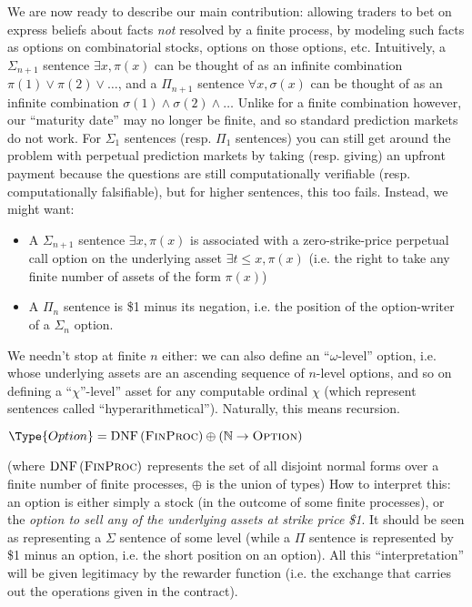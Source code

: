 \documentclass{article}
\begin{document}
We are now ready to describe our main contribution: allowing traders to bet on express beliefs about facts \emph{not} resolved by a finite process, by modeling such facts as options on combinatorial stocks, options on those options, etc. Intuitively, a $\Sigma_{n+1}$ sentence $\exists x, \pi(x)$ can be thought of as an infinite combination $\pi(1)\lor \pi(2)\lor \dots$, and a $\Pi_{n+1}$ sentence $\forall x, \sigma(x)$ can be thought of as an infinite combination $\sigma(1)\land\sigma(2)\land\dots$ Unlike for a finite combination however, our ``maturity date'' may no longer be finite, and so standard prediction markets do not work. For $\Sigma_1$ sentences (resp. $\Pi_1$ sentences) you can still get around the problem with perpetual prediction markets by taking (resp. giving) an upfront payment because the questions are still computationally verifiable (resp. computationally falsifiable), but for higher sentences, this too fails. Instead, we might want:

\begin{itemize}
    \item A $\Sigma_{n+1}$ sentence $\exists x, \pi(x)$ is associated with a zero-strike-price perpetual call option on the underlying asset $\exists t \le x, \pi(x)$ (i.e. the right to take any finite number of assets of the form $\pi(x)$)
    \item A $\Pi_{n}$ sentence is \$1 minus its negation, i.e. the position of the option-writer of a $\Sigma_n$ option.
\end{itemize}

We needn't stop at finite $n$ either: we can also define an ``$\omega$-level'' option, i.e. whose underlying assets are an ascending sequence of $n$-level options, and so on defining a ``$\chi$''-level'' asset for any computable ordinal $\chi$ (which represent sentences called ``hyperarithmetical''). Naturally, this means recursion.

\begin{algorithm}
\begin{algorithmic}
    \State $\Type{Option} = \DNF{\FinProc} \oplus (\Nats \to \Option)$
\end{algorithmic}
\end{algorithm}

(where $\DNF{\FinProc}$ represents the set of all disjoint normal forms over a finite number of finite processes, $\oplus$ is the union of types) How to interpret this: an option is either simply a stock (in the outcome of some finite processes), or the \emph{option to sell any of the underlying assets at strike price \$1}. It should be seen as representing a $\Sigma$ sentence of some level (while a $\Pi$ sentence is represented by \$1 minus an option, i.e. the short position on an option). All this ``interpretation'' will be given legitimacy by the rewarder function (i.e. the exchange that carries out the operations given in the contract). 
\end{document}
